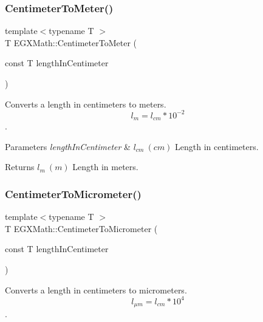 \subsubsection{\texorpdfstring{Centimeter\+To\+Meter()}{CentimeterToMeter()}}
{\footnotesize\ttfamily template$<$typename T $>$ \\
T E\+G\+X\+Math\+::\+Centimeter\+To\+Meter (\begin{DoxyParamCaption}\item[{const T}]{length\+In\+Centimeter }\end{DoxyParamCaption})}



Converts a length in centimeters to meters. \[ l_{m}=l_{cm} * 10^{-2} \]. 


\begin{DoxyParams}{Parameters}
{\em length\+In\+Centimeter} & $ l_{cm}\ (cm)$ Length in centimeters. \\
\hline
\end{DoxyParams}
\begin{DoxyReturn}{Returns}
$ l_{m}\ (m)$ Length in meters. 
\end{DoxyReturn}
\mbox{\label{group___e_g_x_math-_conversions-_length_conversions-_centimeter-_s_i_gaa05fd2c1b2c9ab2ac8aa7f1ef8be612a}} 
\subsubsection{\texorpdfstring{Centimeter\+To\+Micrometer()}{CentimeterToMicrometer()}}
{\footnotesize\ttfamily template$<$typename T $>$ \\
T E\+G\+X\+Math\+::\+Centimeter\+To\+Micrometer (\begin{DoxyParamCaption}\item[{const T}]{length\+In\+Centimeter }\end{DoxyParamCaption})}



Converts a length in centimeters to micrometers. \[ l_{\mu m}=l_{cm} * 10^{4} \]. 

